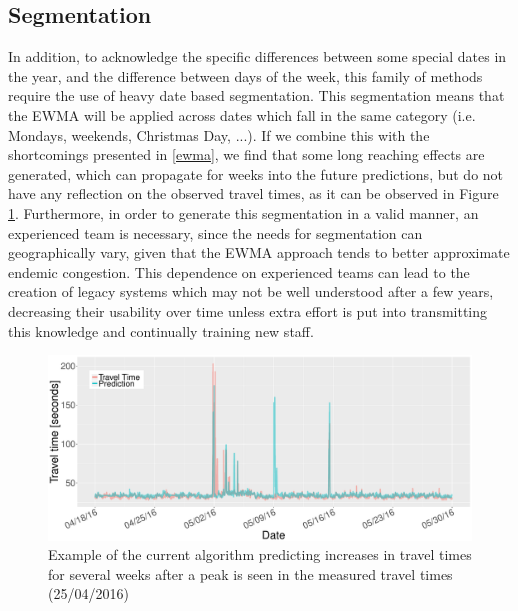 \documentclass[conference]{IEEEtran}
\begin{document}
\subsection{Segmentation}\label{segmentation}
In addition, to acknowledge the specific differences between some special dates in the year, and the difference between days of the week, this family of methods require the use of heavy date based segmentation. 
This segmentation means that the EWMA will be applied across dates which fall in the same category (i.e. Mondays, weekends, Christmas Day, ...).
If we combine this with the shortcomings presented in \ref{ewma}, we find that some long reaching effects are generated, which can propagate for weeks into the future predictions, but do not have any reflection on the observed travel times, as it can be observed in Figure \ref{fig:EWMA_spike}.
Furthermore, in order to generate this segmentation in a valid manner, an experienced team is necessary, since the needs for segmentation can geographically vary, given that the EWMA approach tends to better approximate endemic congestion. 
This dependence on experienced teams can lead to the creation of legacy systems which may not be well understood after a few years, decreasing their usability over time unless extra effort is put into transmitting this knowledge and continually training new staff.
\begin{figure}
	\includegraphics[width=\linewidth]{EWMA.pdf}
	\caption{Example of the current algorithm predicting increases in travel times for several weeks after a peak is seen in the measured travel times (25/04/2016)}
	\label{fig:EWMA_spike}
\end{figure}
\end{document}
